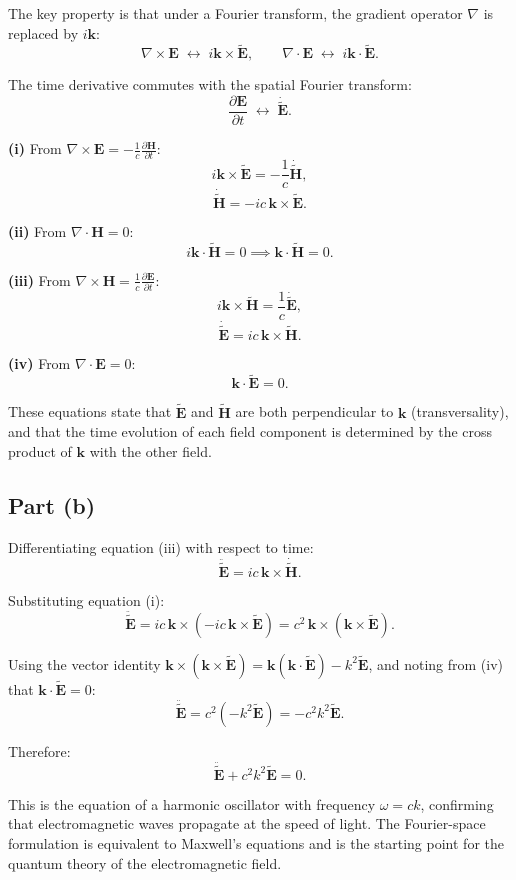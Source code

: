 \documentclass[12pt]{article}
\begin{document}
The key property is that under a Fourier transform, the gradient operator $\nabla$ is replaced by $i\mathbf{k}$:
\[
\nabla \times \mathbf{E} \;\longleftrightarrow\; i\mathbf{k}\times\tilde{\mathbf{E}}, \qquad \nabla\cdot\mathbf{E} \;\longleftrightarrow\; i\mathbf{k}\cdot\tilde{\mathbf{E}}.
\]

The time derivative commutes with the spatial Fourier transform:
\[
\frac{\partial\mathbf{E}}{\partial t} \;\longleftrightarrow\; \dot{\tilde{\mathbf{E}}}.
\]

\textbf{(i)} From $\nabla\times\mathbf{E} = -\frac{1}{c}\frac{\partial\mathbf{H}}{\partial t}$:
\[
i\mathbf{k}\times\tilde{\mathbf{E}} = -\frac{1}{c}\dot{\tilde{\mathbf{H}}},
\]
\[
\boxed{\dot{\tilde{\mathbf{H}}} = -ic\,\mathbf{k}\times\tilde{\mathbf{E}}.}
\]

\textbf{(ii)} From $\nabla\cdot\mathbf{H} = 0$:
\[
i\mathbf{k}\cdot\tilde{\mathbf{H}} = 0 \implies \boxed{\mathbf{k}\cdot\tilde{\mathbf{H}} = 0.}
\]

\textbf{(iii)} From $\nabla\times\mathbf{H} = \frac{1}{c}\frac{\partial\mathbf{E}}{\partial t}$:
\[
i\mathbf{k}\times\tilde{\mathbf{H}} = \frac{1}{c}\dot{\tilde{\mathbf{E}}},
\]
\[
\boxed{\dot{\tilde{\mathbf{E}}} = ic\,\mathbf{k}\times\tilde{\mathbf{H}}.}
\]

\textbf{(iv)} From $\nabla\cdot\mathbf{E} = 0$:
\[
\boxed{\mathbf{k}\cdot\tilde{\mathbf{E}} = 0.}
\]

These equations state that $\tilde{\mathbf{E}}$ and $\tilde{\mathbf{H}}$ are both perpendicular to $\mathbf{k}$ (transversality), and that the time evolution of each field component is determined by the cross product of $\mathbf{k}$ with the other field.

\subsection*{Part (b)}

Differentiating equation (iii) with respect to time:
\[
\ddot{\tilde{\mathbf{E}}} = ic\,\mathbf{k}\times\dot{\tilde{\mathbf{H}}}.
\]

Substituting equation (i):
\[
\ddot{\tilde{\mathbf{E}}} = ic\,\mathbf{k}\times\left(-ic\,\mathbf{k}\times\tilde{\mathbf{E}}\right) = c^2\,\mathbf{k}\times(\mathbf{k}\times\tilde{\mathbf{E}}).
\]

Using the vector identity $\mathbf{k}\times(\mathbf{k}\times\tilde{\mathbf{E}}) = \mathbf{k}(\mathbf{k}\cdot\tilde{\mathbf{E}}) - k^2\tilde{\mathbf{E}}$, and noting from (iv) that $\mathbf{k}\cdot\tilde{\mathbf{E}} = 0$:
\[
\ddot{\tilde{\mathbf{E}}} = c^2\left(-k^2\tilde{\mathbf{E}}\right) = -c^2 k^2\tilde{\mathbf{E}}.
\]

Therefore:
\[
\boxed{\ddot{\tilde{\mathbf{E}}} + c^2 k^2\tilde{\mathbf{E}} = 0.}
\]

This is the equation of a harmonic oscillator with frequency $\omega = ck$, confirming that electromagnetic waves propagate at the speed of light. The Fourier-space formulation is equivalent to Maxwell's equations and is the starting point for the quantum theory of the electromagnetic field.
\end{document}

